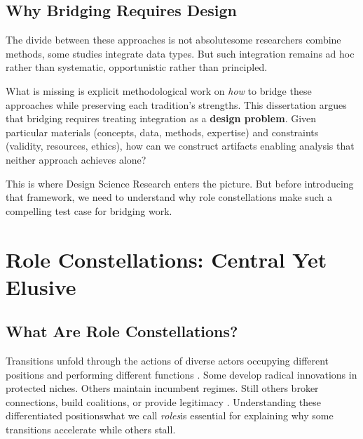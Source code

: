 \documentclass[../main.tex]{subfiles}
\begin{document}
\subsection{Why Bridging Requires Design}

The divide between these approaches is not absolute\textemdash some researchers combine methods, some studies integrate data types. But such integration remains ad hoc rather than systematic, opportunistic rather than principled.

What is missing is explicit methodological work on \emph{how} to bridge these approaches while preserving each tradition's strengths. This dissertation argues that bridging requires treating integration as a \textbf{design problem}. Given particular materials (concepts, data, methods, expertise) and constraints (validity, resources, ethics), how can we construct artifacts enabling analysis that neither approach achieves alone?

This is where Design Science Research enters the picture. But before introducing that framework, we need to understand why role constellations make such a compelling test case for bridging work.


\section{Role Constellations: Central Yet Elusive}
\label{sec:intro:roles}

\subsection{What Are Role Constellations?}

Transitions unfold through the actions of diverse actors occupying different positions and performing different functions \cite{avelino2009power,fischer2016actors,laakso2024}. Some develop radical innovations in protected niches. Others maintain incumbent regimes. Still others broker connections, build coalitions, or provide legitimacy \cite{burt1992structural,granovetter1973strength}. Understanding these differentiated positions\textemdash what we call \emph{roles}\textemdash is essential for explaining why some transitions accelerate while others stall.
\end{document}
